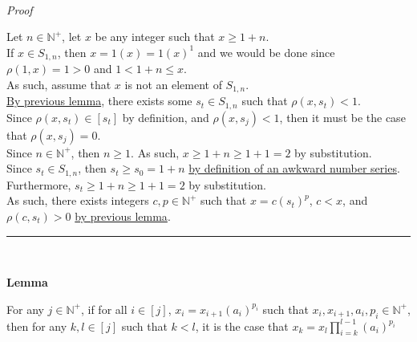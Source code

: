 \documentclass[a4paper,12pt]{article}
\begin{document}
\noindent \\
\textit{Proof}

\noindent Let $n \in \mathbb{N}^+$, let $x$ be any integer such that $x \geq 1 + n$.\\

\noindent If $x \in S_{1, n}$, then $x = 1(x) = 1(x)^1$ and we would be done since $\rho(1, x) = 1 > 0$ and $1 < 1 + n \leq x$.\\

\noindent As such, assume that $x$ is not an element of $S_{1, n}$.\\

\noindent \noindent \hyperlink{lemma:exists_element_less_than_x}{By previous lemma}, there exists some $s_t \in S_{1, n}$ such that $\rho(x, s_t) < 1$.\\

\noindent Since $\rho(x, s_t) \in [s_t]$ by definition, and $\rho(x, s_j) < 1$, then it must be the case that $\rho(x, s_j) = 0$.\\

\noindent Since $n \in \mathbb{N}^+$, then $n \geq 1$. As such, $x \geq 1 + n \geq 1 + 1 = 2$ by substitution.\\

\noindent Since $s_t \in S_{1, n}$, then $s_t \geq s_0 = 1 + n$ \hyperlink{definition:awkward_number_series}{by definition of an awkward number series}.\\

\noindent Furthermore, $s_t \geq 1 + n \geq 1 + 1 = 2$ by substitution.\\

\noindent As such, there exists integers $c, p \in \mathbb{N}^+$ such that $x = c(s_t)^p$, $c < x$, and $\rho(c, s_t) > 0$ \hyperlink{lemma:remainder_powers}{by previous lemma}.

\begin{center}
\noindent\rule{8cm}{0.4pt}
\end{center}
\noindent \\









\label{lemma:closed_form_of_factorization}
\hypertarget{lemma:closed_form_of_factorization}{}
\begin{tcolorbox}
\textbf{Lemma}

For any $j \in \mathbb{N}^+$, if for all $i \in [j]$, $x_i = x_{i + 1}(a_i)^{p_i}$ such that $x_i, x_{i + 1}, a_i, p_i \in \mathbb{N}^+$, then for any $k, l \in [j]$ such that $k < l$, it is the case that $\displaystyle x_k = x_l \prod_{i = k}^{l - 1} (a_i)^{p_i}$
\end{tcolorbox}
\end{document}
